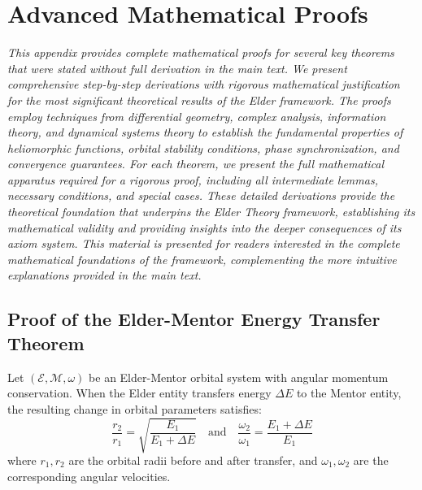 \chapter{Advanced Mathematical Proofs}

\textit{This appendix provides complete mathematical proofs for several key theorems that were stated without full derivation in the main text. We present comprehensive step-by-step derivations with rigorous mathematical justification for the most significant theoretical results of the Elder framework. The proofs employ techniques from differential geometry, complex analysis, information theory, and dynamical systems theory to establish the fundamental properties of heliomorphic functions, orbital stability conditions, phase synchronization, and convergence guarantees. For each theorem, we present the full mathematical apparatus required for a rigorous proof, including all intermediate lemmas, necessary conditions, and special cases. These detailed derivations provide the theoretical foundation that underpins the Elder Theory framework, establishing its mathematical validity and providing insights into the deeper consequences of its axiom system. This material is presented for readers interested in the complete mathematical foundations of the framework, complementing the more intuitive explanations provided in the main text.}

\section{Proof of the Elder-Mentor Energy Transfer Theorem}

\begin{theorem}
Let $(\mathcal{E}, \mathcal{M}, \omega)$ be an Elder-Mentor orbital system with angular momentum conservation. When the Elder entity transfers energy $\Delta E$ to the Mentor entity, the resulting change in orbital parameters satisfies:
\begin{equation}
\frac{r_2}{r_1} = \sqrt{\frac{E_1}{E_1 + \Delta E}} \quad \text{and} \quad \frac{\omega_2}{\omega_1} = \frac{E_1 + \Delta E}{E_1}
\end{equation}
where $r_1, r_2$ are the orbital radii before and after transfer, and $\omega_1, \omega_2$ are the corresponding angular velocities.
\end{theorem}

